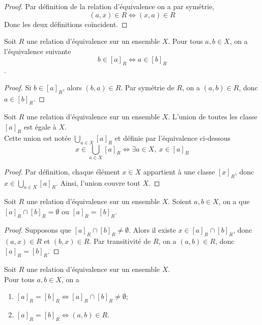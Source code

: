 \begin{proof}
    Par définition de la relation d'équivalence on a par symétrie,
    \[
    (a, x) \in R \iff (x, a) \in R
    \]
    Donc les deux définitions coïncident.    
\end{proof}

\begin{lemme}
    Soit $R$ une relation d'équivalence sur un ensemble $X$. Pour tous $a,b\in X$, on a l'équivalence suivante\\ \[b\in [a]_R \Leftrightarrow a\in [b]_R\].
\end{lemme}

\begin{proof}
Si $b \in [a]_R$, alors $(b, a) \in R$. Par symétrie de $R$, on a $(a, b) \in R$, donc $a \in [b]_R$.
\end{proof}

\begin{lemme}
    Soit $R$ une relation d'équivalence sur un ensemble $X$. L'union de toutes les classe $[a]_R$ est égale à $X$.\\
    Cette union est notée $\bigcup\limits_{a \in X} [a]_R$ et définie par l'équivalence ci-dessous\\
    \[x\in \bigcup\limits_{a \in X} [a]_R \Leftrightarrow \exists a \in X,\:x\in [a]_R \]
\end{lemme}

\begin{proof}
    Par définition, chaque élément $x \in X$ appartient à une classe $[x]_R$, donc $x \in \bigcup_{a \in X} [a]_R$. Ainsi, l'union couvre tout $X$.
\end{proof}

\begin{theoreme} \label{relationdequiv}
    Soit $R$ une relation d'équivalence sur un ensemble $X$. Soient $a,b \in X$, on a que $[a]_R\cap [b]_R=\emptyset$ ou $[a]_R=[b]_R$.
\end{theoreme}

\begin{proof}
    Supposons que $[a]_R \cap [b]_R \neq \emptyset$. Alors il existe $x \in [a]_R \cap [b]_R$, donc $(a, x) \in R$ et $(b, x) \in R$.
    Par transitivité de $R$, on a $(a, b) \in R$, donc $[a]_R = [b]_R$.
\end{proof}

\begin{lemme}
    Soit $R$ une relation d'équivalence sur un ensemble $X$.\\ Pour tous $a,b\in X$, on a
    \begin{enumerate}
        \item $[a]_R=[b]_R \Leftrightarrow [a]_R \cap[b]_R \neq \emptyset$;
        \item $[a]_R=[b]_R \Leftrightarrow (a,b)\in R$.
        \end{enumerate}
\end{lemme}

